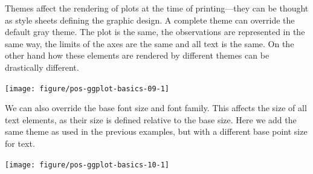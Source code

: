 \documentclass[krantz2]{krantz}\usepackage{knitr}%
\begin{document}
Themes affect the rendering of plots at the time of printing---they can be thought as style sheets defining the graphic design. A complete theme can override the default gray theme. The plot is the same, the observations are represented in the same way, the limits of the axes are the same and all text is the same. On the other hand how these elements are rendered by different themes can be drastically different.

\begin{knitrout}\footnotesize
{}\color{fgcolor}\begin{kframe}
\begin{alltt}
\hlstd{(} 
       \hlstd{(}    \hlopt{+}
  \hlstd{()} \hlopt{+}
  \hlstd{()}
\end{alltt}
\end{kframe}

{\centering \texttt{[image: figure/pos-ggplot-basics-09-1]} 

}



\end{knitrout}

We can also override the base font size and font family. This affects the size of all text elements, as their size is defined relative to the base size. Here we add the same theme as used in the previous examples, but with a different base point size for text.

\begin{knitrout}\footnotesize
{}\color{fgcolor}\begin{kframe}
\begin{alltt}
\hlstd{(} 
       \hlstd{(}    \hlopt{+}
  \hlstd{()} \hlopt{+}
  \hlstd{(}\hlstd{,}  \hlstd{=} \hlstd{)}
\end{alltt}
\end{kframe}

{\centering \texttt{[image: figure/pos-ggplot-basics-10-1]} 

}



\end{knitrout}
\end{document}
